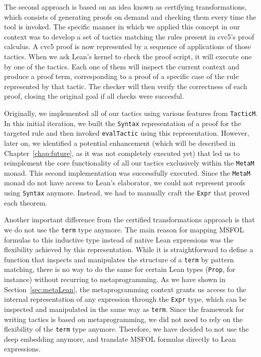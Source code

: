 The second approach is based on an idea known as certifying
transformations, which consists of generating proofs on demand
and checking them every time the tool is invoked.
%
The specific manner in which we applied
this concept in our context was to develop a set of tactics matching
the rules present in cvc5's proof calculus.
A cvc5 proof is now represented by a sequence of applications of those tactics.
When we ask Lean's kernel to check the proof script, it will execute one by one
of the tactics. Each one of them will inspect the current context
and produce a proof term, corresponding to a proof of a specific
case of the rule represented by that tactic.
The checker will then verify the correctness of each proof, closing the original goal if
all checks were succesful.

Originally, we implemented all of our tactics using various features from
\texttt{TacticM}.
In this initial iteration, we built the \texttt{Syntax} representation of a proof for the targeted rule and then invoked \texttt{evalTactic} using this representation.
However, later on, we identified a potential enhancement (which will be described in Chapter~\ref{chap:future}, as it was not completely executed yet) that led us to reimplement the
core functionality of all our tactics exclusively within the \texttt{MetaM} monad. This
second implementation was successfully executed.
Since the \texttt{MetaM} monad do not have access to Lean's elaborator, we could not represent proofs using
\texttt{Syntax} anymore. Instead, we had to manually craft the \texttt{Expr} that proved each theorem.

Another important difference from the certified transformations approach is that we do not use the \texttt{term}
type anymore. The main reason for mapping MSFOL formulas to this inductive type
instead of native Lean expressions was the flexibility achieved by this representation.
While it is straightforward to define a function that inspects and manipulates the structure of
a \texttt{term} by pattern matching, there is no way to do the same for certain Lean types (\texttt{Prop}, for
instance) without recurring to metaprogramming. As we have shown in Section~\ref{sec:metaLean},
the metaprogramming context grants us access to the internal representation of any expression
through the \texttt{Expr} type, which can be inspected and manipulated in the same way
as \texttt{term}. Since the framework for writing tactics is based on metaprogramming, we
did not need to rely on the flexibility of the \texttt{term} type anymore. Therefore, we
have decided to not use the deep embedding anymore, and translate MSFOL formulas directly
to Lean expressions.

